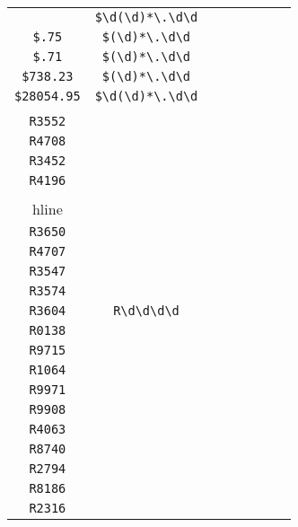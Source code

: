 \begin{longtable}{cccccccc}
\begin{tabular}{ll}
    \verb|$0.44| & \verb|$\d(\d)*\.\d\d|\\
\verb|$.75| & \verb|$(\d)*\.\d\d|\\
\verb|$.71| & \verb|$(\d)*\.\d\d|\\
\verb|$738.23| & \verb|$(\d)*\.\d\d|\\
\verb|$28054.95| & \verb|$\d(\d)*\.\d\d|
\end{tabular}
\\\midrule 
\begin{tabular}{l}
    \verb|R4703|\\
\verb|R3552|\\
\verb|R4708|\\
\verb|R3452|\\
\verb|R4196|\\
\\hline\\
\verb|R3650|\\
\verb|R4707|\\
\verb|R3547|\\
\verb|R3574|\\
\verb|R3604|
\end{tabular}

&
\verb|R\d\d\d\d|
&

\begin{tabular}{l}
    \verb|R\d\d\d\d|\\
\verb|R0138|\\
\verb|R9715|\\
\verb|R1064|\\
\verb|R9971|\\
\verb|R9908|
\end{tabular}

&

\begin{tabular}{l}
    \verb|R\d\d\d\d|\\
\verb|R4063|\\
\verb|R8740|\\
\verb|R2794|\\
\verb|R8186|\\
\verb|R2316|
\end{tabular}

&


\end{longtable}
